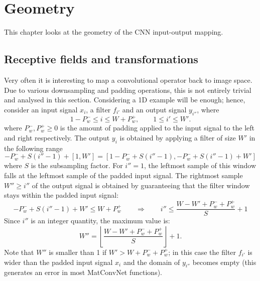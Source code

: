 \chapter{Geometry}\label{s:geometry}

This chapter looks at the geometry of the CNN input-output mapping.

\section{Receptive fields and transformations}\label{s:receptive}

Very often it is interesting to map a convolutional operator back to image space. Due to various downsampling and padding operations, this is not entirely trivial and analysed in this section. Considering a 1D example will be enough; hence, consider an input signal $x_i$, a filter $f_{i'}$ and an output signal $y_{i''}$, where
\[
   1 - P_w^- \leq i \leq W + P_w^+,  \qquad 1 \leq i' \leq W'.
\]
where $P_w^-,P_w^+ \geq 0$ is the amount of padding applied to the input signal to the left and right respectively. The output $y_i$ is obtained by applying a filter of size $W'$ in the following range
\[
   - P_w^- + S (i'' - 1) + [1, W'] = [1 - P_w^- + S(i'' - 1), - P_w^- + S(i''-1) + W']
\]
where $S$ is the subsampling factor. For $i'' = 1$, the leftmost sample of this window falls at the leftmost sample of the padded input signal. The rightmost sample $W'' \geq i''$ of the output signal is obtained by guaranteeing that the filter window stays within the padded input signal:
\[
- P_w^- + S(i''-1) + W' \leq W + P_w^+
\qquad\Rightarrow\qquad
i'' \leq \frac{W - W' + P_w^- + P_w^+}{S} + 1
\]
Since $i''$ is an integer quantity, the maximum value is:
\begin{equation}\label{e:width}
W'' = 
\left\lfloor \frac{W - W' + P_w^- + P_w^+}{S} \right\rfloor
+ 1.
\end{equation}
Note that $W''$ is smaller than 1 if $W' > W + P_w^- + P_w^+$; in this case the filter $f_{i'}$ is wider than the padded input signal $x_i$ and the domain of $y_{i''}$ becomes empty (this generates an error in most MatConvNet functions).

